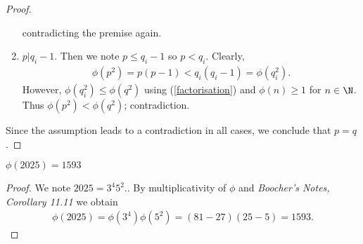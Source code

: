 \documentclass{article}
\begin{document}
\begin{claim*}[1]
\begin{proof}
\begin{enumerate}
               contradicting the premise again.
         \item $p|q_i-1$. Then we note $p\leq q_i-1$ so $p<q_i$.  Clearly,
               \begin{align*}
                  \phi\left(p^2\right)=p(p-1)<q_i(q_i-1)=\phi\left(q_i^2\right).
               \end{align*}
               However, $\phi\left(q_i^2\right)\leq \phi\left(q^2\right)$ using
               (\ref{factorisation}) and $\phi(n)\geq 1$ for $n\in\N$. Thus
               $\phi\left(p^2\right)<\phi\left(q^2\right)$; contradiction.
      \end{enumerate}
      Since the assumption leads to a contradiction in all cases, we conclude
      that $p=q$.
   \end{proof}
\end{claim*}

\begin{claim*}[2]
   $\phi(2025)=1593$
   \begin{proof}
      We note $2025 = 3^4 5^2$..
      By multiplicativity of $\phi$ and \emph{Boocher's Notes, Corollary 11.11}
      we obtain
      \begin{align*}
         \phi(2025) = \phi(3^4)\phi(5^2) = (81-27)(25-5) = 1593.
      \end{align*}
   \end{proof}
\end{claim*}
\end{document}
